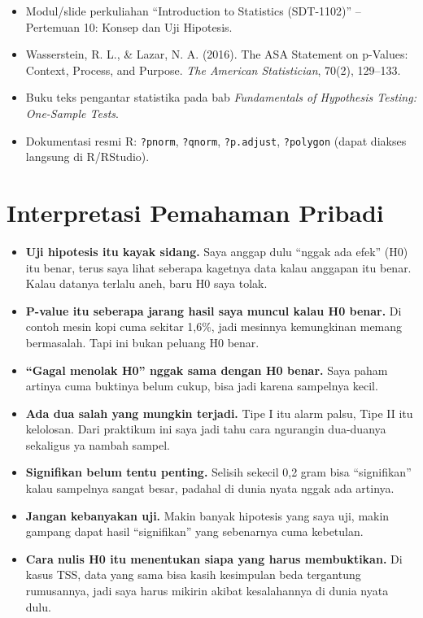 \documentclass[
  indonesian,
  letterpaper,
]{book}
\providecommand{\tightlist}{%
  \setlength{\itemsep}{0pt}\setlength{\parskip}{0pt}}
\begin{document}
\begin{itemize}
\tightlist
\item
  Modul/slide perkuliahan ``Introduction to Statistics (SDT-1102)'' --
  Pertemuan 10: Konsep dan Uji Hipotesis.
\item
  Wasserstein, R. L., \& Lazar, N. A. (2016). The ASA Statement on
  p-Values: Context, Process, and Purpose. \emph{The American
  Statistician}, 70(2), 129--133.
\item
  Buku teks pengantar statistika pada bab \emph{Fundamentals of
  Hypothesis Testing: One-Sample Tests}.
\item
  Dokumentasi resmi R: \texttt{?pnorm}, \texttt{?qnorm},
  \texttt{?p.adjust}, \texttt{?polygon} (dapat diakses langsung di
  R/RStudio).
\end{itemize}

\section{Interpretasi Pemahaman
Pribadi}\label{interpretasi-pemahaman-pribadi-1}

\begin{itemize}
\tightlist
\item
  \textbf{Uji hipotesis itu kayak sidang.} Saya anggap dulu ``nggak ada
  efek'' (H0) itu benar, terus saya lihat seberapa kagetnya data kalau
  anggapan itu benar. Kalau datanya terlalu aneh, baru H0 saya tolak.
\item
  \textbf{P-value itu seberapa jarang hasil saya muncul kalau H0 benar.}
  Di contoh mesin kopi cuma sekitar 1,6\%, jadi mesinnya kemungkinan
  memang bermasalah. Tapi ini bukan peluang H0 benar.
\item
  \textbf{``Gagal menolak H0'' nggak sama dengan H0 benar.} Saya paham
  artinya cuma buktinya belum cukup, bisa jadi karena sampelnya kecil.
\item
  \textbf{Ada dua salah yang mungkin terjadi.} Tipe I itu alarm palsu,
  Tipe II itu kelolosan. Dari praktikum ini saya jadi tahu cara
  ngurangin dua-duanya sekaligus ya nambah sampel.
\item
  \textbf{Signifikan belum tentu penting.} Selisih sekecil 0,2 gram bisa
  ``signifikan'' kalau sampelnya sangat besar, padahal di dunia nyata
  nggak ada artinya.
\item
  \textbf{Jangan kebanyakan uji.} Makin banyak hipotesis yang saya uji,
  makin gampang dapat hasil ``signifikan'' yang sebenarnya cuma
  kebetulan.
\item
  \textbf{Cara nulis H0 itu menentukan siapa yang harus membuktikan.} Di
  kasus TSS, data yang sama bisa kasih kesimpulan beda tergantung
  rumusannya, jadi saya harus mikirin akibat kesalahannya di dunia nyata
  dulu.
\end{itemize}
\end{document}
